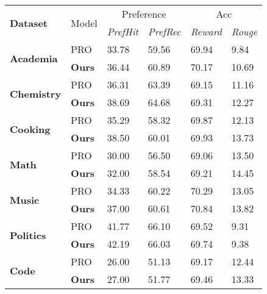 \begin{table}[h]
\centering
\renewcommand{\arraystretch}{1.02}
\begin{adjustbox}{width=0.48\textwidth} %
\begin{tabularx}{0.495\textwidth}{p{1.2cm} p{0.7cm} p{0.95cm}p{0.95cm}p{0.7cm}p{0.7cm}}
     \toprule
    \multirow{2}{*}{\small \textbf{Dataset}} & \multirow{2}{*}{\small Model} & \multicolumn{2}{c}{\small Preference} & \multicolumn{2}{c}{\small Acc } \\ 
    & & \small \textit{PrefHit} & \small \textit{PrefRec} & \small \textit{Reward} & \small \textit{Rouge} \\ 
    \midrule
    \multirow{2}{*}{\small \textbf{Academia}}   & \small PRO & 33.78 & 59.56 & 69.94 & 9.84 \\ 
                                & \small \textbf{Ours} & 36.44 & 60.89 & 70.17 & 10.69 \\ 
    \midrule
    \multirow{2}{*}{\small \textbf{Chemistry}}  & \small PRO & 36.31 & 63.39 & 69.15 & 11.16 \\ 
                                & \small \textbf{Ours} & 38.69 & 64.68 & 69.31 & 12.27 \\ 
    \midrule
    \multirow{2}{*}{\small \textbf{Cooking}}    & \small PRO & 35.29 & 58.32 & 69.87 & 12.13 \\ 
                                & \small \textbf{Ours} & 38.50 & 60.01 & 69.93 & 13.73 \\ 
    \midrule
    \multirow{2}{*}{\small \textbf{Math}}       & \small PRO & 30.00 & 56.50 & 69.06 & 13.50 \\ 
                                & \small \textbf{Ours} & 32.00 & 58.54 & 69.21 & 14.45 \\ 
    \midrule
    \multirow{2}{*}{\small \textbf{Music}}      & \small PRO & 34.33 & 60.22 & 70.29 & 13.05 \\ 
                                & \small \textbf{Ours} & 37.00 & 60.61 & 70.84 & 13.82 \\ 
    \midrule
    \multirow{2}{*}{\small \textbf{Politics}}   & \small PRO & 41.77 & 66.10 & 69.52 & 9.31 \\ 
                                & \small \textbf{Ours} & 42.19 & 66.03 & 69.74 & 9.38 \\ 
    \midrule
    \multirow{2}{*}{\small \textbf{Code}} & \small PRO & 26.00 & 51.13 & 69.17 & 12.44 \\ 
                                & \small \textbf{Ours} & 27.00 & 51.77 & 69.46 & 13.33 \\ 

\end{tabularx}
\end{adjustbox}
\end{table}
